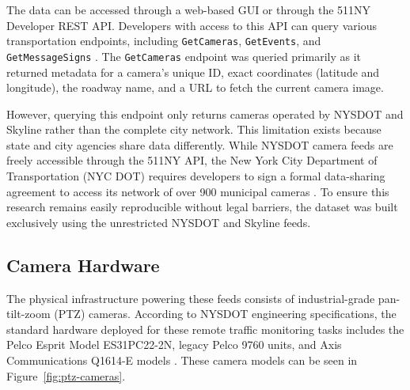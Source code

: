 The data can be accessed through a web-based GUI or through the 511NY 
Developer REST API. Developers with access to this API can query various 
transportation endpoints, including 
\verb|GetCameras|, \verb|GetEvents|, and \verb|GetMessageSigns| \cite{511ny_api_docs}. 
The \verb|GetCameras| endpoint was queried primarily as it returned metadata for a 
camera's unique ID, exact coordinates (latitude and longitude), the roadway name,
and a URL to fetch the current camera image.

However, querying this endpoint only returns cameras operated by NYSDOT and 
Skyline rather than the complete city network. This limitation exists because 
state and city agencies share data differently. While NYSDOT camera feeds are 
freely accessible through the 511NY API, the New York City Department of 
Transportation (NYC DOT) requires developers to sign a formal data-sharing 
agreement to access its network of over 900 municipal cameras
\cite{NYCDOT_data_feeds, NYCDOT_realtime_metadata_2010}.
To ensure this research remains easily reproducible without legal barriers, 
the dataset was built exclusively using the unrestricted NYSDOT and Skyline feeds.


\subsection{Camera Hardware}

The physical infrastructure powering these feeds consists of industrial-grade pan-tilt-zoom
(PTZ) cameras. According to NYSDOT engineering specifications, the standard hardware 
deployed for these remote traffic monitoring tasks includes the Pelco Esprit Model 
ES31PC22-2N, legacy Pelco 9760 units, and Axis Communications Q1614-E models
\cite{NYCDOT_item_2014, NYCDOT_item_2024}. These camera models can be seen 
in Figure~\ref{fig:ptz-cameras}. 

